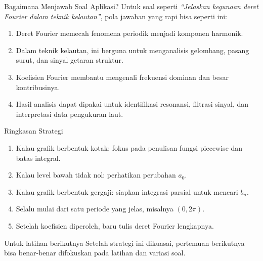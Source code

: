 \documentclass[aspectratio=169,10pt]{beamer}
\begin{document}
\begin{frame}{Bagaimana Menjawab Soal Aplikasi?}
Untuk soal seperti \textit{``Jelaskan kegunaan deret Fourier dalam teknik kelautan''}, pola jawaban yang rapi bisa seperti ini:
\begin{enumerate}
  \item Deret Fourier memecah fenomena periodik menjadi komponen harmonik.
  \item Dalam teknik kelautan, ini berguna untuk menganalisis gelombang, pasang surut, dan sinyal getaran struktur.
  \item Koefisien Fourier membantu mengenali frekuensi dominan dan besar kontribusinya.
  \item Hasil analisis dapat dipakai untuk identifikasi resonansi, filtrasi sinyal, dan interpretasi data pengukuran laut.
\end{enumerate}
\end{frame}

\begin{frame}{Ringkasan Strategi}
\begin{enumerate}
  \item Kalau grafik berbentuk kotak: fokus pada penulisan fungsi piecewise dan batas integral.
  \item Kalau level bawah tidak nol: perhatikan perubahan \(a_0\).
  \item Kalau grafik berbentuk gergaji: siapkan integrasi parsial untuk mencari \(b_n\).
  \item Selalu mulai dari satu periode yang jelas, misalnya \((0,2\pi)\).
  \item Setelah koefisien diperoleh, baru tulis deret Fourier lengkapnya.
\end{enumerate}
\begin{alertblock}{Untuk latihan berikutnya}
Setelah strategi ini dikuasai, pertemuan berikutnya bisa benar-benar difokuskan pada latihan dan variasi soal.
\end{alertblock}
\end{frame}
\end{document}
